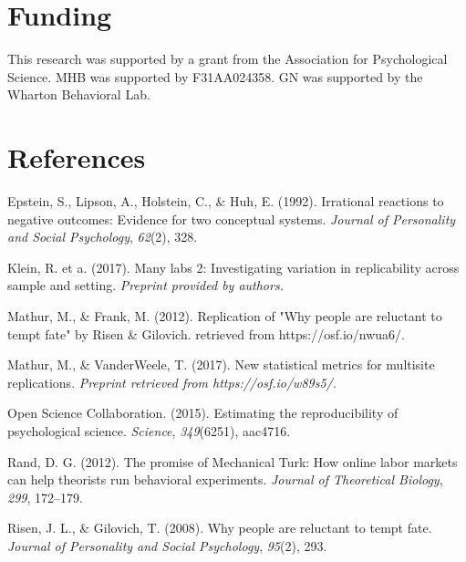 \documentclass[english,floatsintext,man]{apa6}
\newcounter{author}
\theoremstyle{definition}
\theoremstyle{definition}
\theoremstyle{definition}
\theoremstyle{remark}
\begin{document}
\section{Funding}\label{funding}

This research was supported by a grant from the Association for
Psychological Science. MHB was supported by F31AA024358. GN was
supported by the Wharton Behavioral Lab.

\newpage

\section{References}\label{references}



\hypertarget{refs}{}
\hypertarget{ref-epstein}{}
Epstein, S., Lipson, A., Holstein, C., \& Huh, E. (1992). Irrational
reactions to negative outcomes: Evidence for two conceptual systems.
\emph{Journal of Personality and Social Psychology}, \emph{62}(2), 328.

\hypertarget{ref-ml2}{}
Klein, R. et a. (2017). Many labs 2: Investigating variation in
replicability across sample and setting. \emph{Preprint provided by
authors.}

\hypertarget{ref-my_rpp_writeup}{}
Mathur, M., \& Frank, M. (2012). Replication of "Why people are
reluctant to tempt fate" by Risen \& Gilovich. retrieved from
https://osf.io/nwua6/.

\hypertarget{ref-mathur_rrr}{}
Mathur, M., \& VanderWeele, T. (2017). New statistical metrics for
multisite replications. \emph{Preprint retrieved from
https://osf.io/w89s5/.}

\hypertarget{ref-rpp}{}
Open Science Collaboration. (2015). Estimating the reproducibility of
psychological science. \emph{Science}, \emph{349}(6251), aac4716.

\hypertarget{ref-rand}{}
Rand, D. G. (2012). The promise of Mechanical Turk: How online labor
markets can help theorists run behavioral experiments. \emph{Journal of
Theoretical Biology}, \emph{299}, 172--179.

\hypertarget{ref-risen}{}
Risen, J. L., \& Gilovich, T. (2008). Why people are reluctant to tempt
fate. \emph{Journal of Personality and Social Psychology}, \emph{95}(2),
293.
\end{document}
